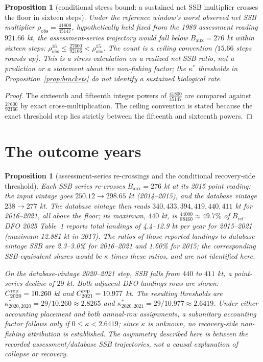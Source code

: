 \documentclass[10pt,twocolumn]{article}
\theoremstyle{plain}
\newtheorem{proposition}[theorem]{Proposition}
\theoremstyle{remark}
\begin{document}
\begin{proposition}[conditional stress bound: a sustained net SSB multiplier crosses the floor in sixteen steps]\label{prop:sustained}
Under the reference window's worst observed net SSB multiplier
\(\rho_{\mathrm{obs}} = \tfrac{41800}{45147}\), hypothetically held fixed
from the 1989 assessment reading \(921.66\) kt, the assessment-series
trajectory would fall below \(B_{\mathrm{aux}} = 276\) kt within sixteen
steps: \(\rho_{\mathrm{obs}}^{16} \le \tfrac{27600}{92166} <
\rho_{\mathrm{obs}}^{15}\). The count is a ceiling convention
(\(15.66\) steps rounds up). This is a stress calculation on a realized
net SSB ratio, not a prediction or a statement about the non-fishing
factor; the \(\kappa^*\) thresholds in Proposition~\ref{prop:brackets}
do not identify a sustained biological rate.
\end{proposition}

\begin{proof}
The sixteenth and fifteenth integer powers of
\(\tfrac{41800}{45147}\) are compared against
\(\tfrac{27600}{92166}\) by exact cross-multiplication. The ceiling
convention is stated because the exact threshold step lies strictly
between the fifteenth and sixteenth powers.
\end{proof}

\section{The outcome years}\label{outcome}

\begin{proposition}[assessment-series re-crossings and the conditional recovery-side threshold]
\label{prop:recovery}
Each SSB series re-crosses \(B_{\mathrm{aux}}=276\) kt at its 2015 point reading: the input vintage goes \(250.12\to298.65\) kt (2014--2015), and the database vintage \(238\to277\) kt. The database vintage then reads \(340,433,394,419,440,411\) kt for 2016--2021, all above the floor; its maximum, \(440\) kt, is \(\tfrac{44000}{88460}\approx49.7\%\) of \(B_{\mathrm{ref}}\). DFO 2025 Table~1 reports total landings of 4.4--12.9 kt per year for 2015--2021 (maximum 12.881 kt in 2017). The ratios of those reported landings to database-vintage SSB are 2.3--3.0\% for 2016--2021 and 1.60\% for 2015; the corresponding SSB-equivalent shares would be \(\kappa\) times these ratios, and are not identified here.

On the database-vintage 2020--2021 step, SSB falls from \(440\) to \(411\) kt, a point-series decline of \(29\) kt. Both adjacent DFO landings rows are shown: \(C_{2020}^{\rm rep}=10.260\) kt and \(C_{2021}^{\rm rep}=10.977\) kt. The resulting thresholds are \(\kappa^*_{2020,2020}=29/10.260\approx2.8265\) and \(\kappa^*_{2020,2021}=29/10.977\approx2.6419\). Under either accounting placement and both annual-row assignments, a subunitary accounting factor follows only if \(0\le\kappa<2.6419\); since \(\kappa\) is unknown, no recovery-side non-fishing attribution is established. The asymmetry described here is between the recorded assessment/database SSB trajectories, not a causal explanation of collapse or recovery.
\end{proposition}
\end{document}
